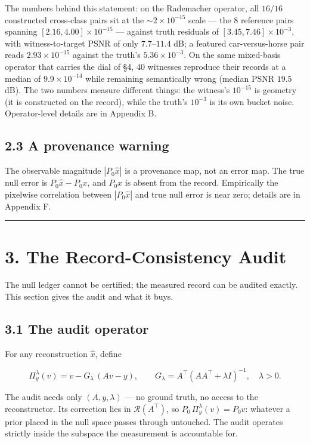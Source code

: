 \documentclass[11pt]{article}
\begin{document}
The numbers behind this statement: on the Rademacher operator, all $16/16$ constructed cross-class pairs sit at the ${\sim}2\times10^{-15}$ scale --- the 8 reference pairs spanning $[2.16, 4.00]\times10^{-15}$ --- against truth residuals of $[3.45, 7.46]\times10^{-3}$, with witness-to-target PSNR of only $7.7$--$11.4$ dB; a featured car-versus-horse pair reads $2.93\times10^{-15}$ against the truth's $5.36\times10^{-3}$. On the same mixed-basis operator that carries the dial of §4, 40 witnesses reproduce their records at a median of $9.9\times10^{-14}$ while remaining semantically wrong (median PSNR $19.5$ dB). The two numbers measure different things: the witness's $10^{-15}$ is geometry (it is constructed on the record), while the truth's $10^{-3}$ is its own bucket noise. Operator-level details are in Appendix B.

\subsection*{2.3 A provenance warning}

The observable magnitude $|P_0\hat{x}|$ is a provenance map, not an error map. The true null error is $P_0\hat{x} - P_0 x$, and $P_0 x$ is absent from the record. Empirically the pixelwise correlation between $|P_0\hat{x}|$ and true null error is near zero; details are in Appendix F.

\medskip\hrule\medskip

\section*{3. The Record-Consistency Audit}

The null ledger cannot be certified; the measured record can be audited exactly. This section gives the audit and what it buys.

\subsection*{3.1 The audit operator}

For any reconstruction $\hat{x}$, define

$$\Pi_y^\lambda(v) = v - G_\lambda\,(Av - y), \qquad G_\lambda = A^\top(AA^\top + \lambda I)^{-1}, \quad \lambda > 0.$$

The audit needs only $(A, y, \lambda)$ --- no ground truth, no access to the reconstructor. Its correction lies in $\mathcal{R}(A^\top)$, so $P_0\,\Pi_y^\lambda(v) = P_0 v$: whatever a prior placed in the null space passes through untouched. The audit operates strictly inside the subspace the measurement is accountable for.
\end{document}
